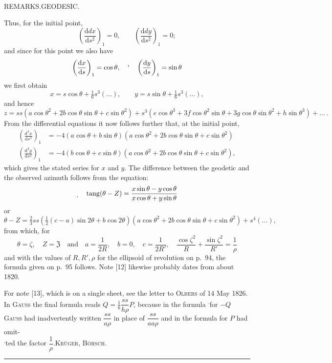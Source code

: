 \clearpage
{}\hfill REMARKS.\quad GEODESIC.\hfill\mbox{}\par
{\small
\noindent Thus, for the initial point,
\[
\left(\frac{\mathrm ddx}{\mathrm ds^2}\right)_1=0,\qquad\left(\frac{\mathrm ddy}{\mathrm ds^2}\right)_1=0;
\]
and since for this point we also have
\[
\left(\frac{\mathrm dx}{\mathrm ds}\right)_1=\cos\theta,\quad\text{\raisebox{1.2ex}{,}}\quad\left(\frac{\mathrm dy}{\mathrm ds}\right)_1=\sin\theta
\]
we first obtain
\[
x=s\cos\theta+\tfrac16s^3(\ldots),\qquad y=s\sin\theta+\tfrac16s^3(\ldots),
\]
and hence
\[
z=ss(a\cos\theta^2+2b\cos\theta\sin\theta+c\sin\theta^2)+s^3(e\cos\theta^3+3f\cos\theta^2\sin\theta+3g\cos\theta\sin\theta^2+h\sin\theta^3)+\ldots\ .
\]
From the differential equations it now follows further that, at the initial point,
\[
\begin{aligned}
\left(\frac{\mathrm d^3x}{\mathrm ds^3}\right)_1&=-4(a\cos\theta+b\sin\theta)(a\cos\theta^2+2b\cos\theta\sin\theta+c\sin\theta^2)\\
\left(\frac{\mathrm d^3y}{\mathrm ds^3}\right)_1&=-4(b\cos\theta+c\sin\theta)(a\cos\theta^2+2b\cos\theta\sin\theta+c\sin\theta^2),
\end{aligned}
\]
which gives the stated series for $x$ and $y$. The difference between the geodetic and the observed azimuth follows from the equation:
\[
\text{\raisebox{-.6ex}{.}}\quad\operatorname{tang}(\theta-Z)=\frac{x\sin\theta-y\cos\theta}{x\cos\theta+y\sin\theta}
\]
or
\[
\theta-Z=\tfrac23ss(\tfrac12(c-a)\sin2\theta+b\cos2\theta)(a\cos\theta^2+2b\cos\theta\sin\theta+c\sin\theta^2)+s^4(\ldots),
\]
from which, for
\[
\theta=\zeta,\quad Z=\mathfrak Z\quad\text{and}\quad a=\frac1{2R},\quad b=0,\quad c=\frac1{2R'},\quad\frac{\cos\zeta^2}{R}+\frac{\sin\zeta^2}{R'}=\frac1\rho
\]
and with the values of $R,R',\rho$ for the ellipsoid of revolution on p.\ 94, the formula given on p.\ 95 follows. Note [12] likewise probably dates from about 1820.

For note [13], which is on a single sheet, see the letter to \textsc{Olbers} of 14 May 1826. In \textsc{Gauss} the final formula reads $Q=\tfrac16\dfrac{ss}{h\rho}P$, because in the formula \textsuperscript{.}for $-Q$ \textsc{Gauss} had inadvertently written $\dfrac{ss}{a\rho}$ in place of $\dfrac{ss}{aa\rho}$ and in the formula for $P$ had omit-\\
\textsuperscript{.}ted the factor $\dfrac1\rho$.\hfill\textsc{Krüger, Börsch.}\par
}
\begin{center}\rule{.24\textwidth}{.4pt}\end{center}

